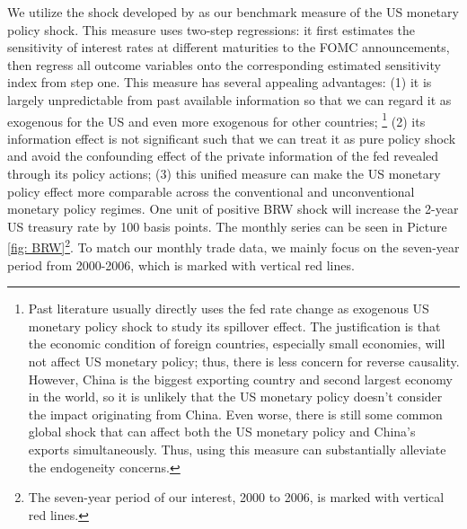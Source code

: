 We utilize the shock developed by \cite{bu2021unified} as our benchmark measure of the US monetary policy shock. This measure uses \cite{fama1973risk} two-step regressions: it first estimates the sensitivity of interest rates at different maturities to the FOMC announcements, then regress all outcome variables onto the corresponding estimated sensitivity index from step one. This measure has several appealing advantages: (1) it is largely unpredictable from past available information so that we can regard it as exogenous for the US and even more exogenous for other countries; \footnote{Past literature usually directly uses the fed rate change as exogenous US monetary policy shock to study its spillover effect. The justification is that the economic condition of foreign countries, especially small economies, will not affect US monetary policy; thus, there is less concern for reverse causality. However, China is the biggest exporting country and second largest economy in the world, so it is unlikely that the US monetary policy doesn't consider the impact originating from China. Even worse, there is still some common global shock that can affect both the US monetary policy and China's exports simultaneously. Thus, using this measure can substantially alleviate the endogeneity concerns.} (2) its information effect is not significant such that we can treat it as pure policy shock and avoid the confounding effect of the private information of the fed revealed through its policy actions; (3) this unified measure can make the US monetary policy effect more comparable across the conventional and unconventional monetary policy regimes. One unit of positive BRW shock will increase the 2-year US treasury rate by 100 basis points. The monthly series can be seen in Picture \ref{fig: BRW}\footnote{The seven-year period of our interest, 2000 to 2006, is marked with vertical red lines.}. To match our monthly trade data, we mainly focus on the seven-year period from 2000-2006, which is marked with vertical red lines.

